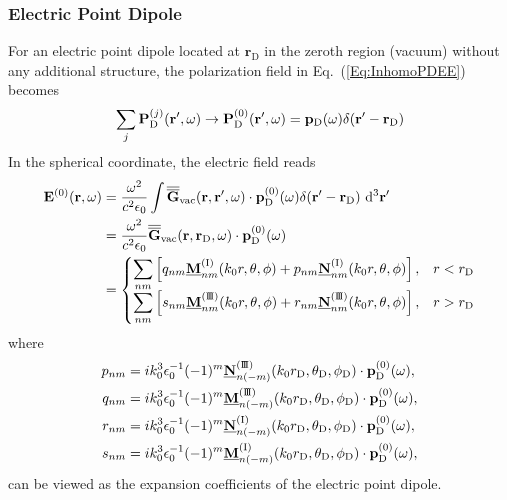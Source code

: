 \documentclass[journal=jacsat,manuscript=article,layout=traditional]{achemso}
\newcommand*\diff{\mathrm{d}}
\newcommand*\emp{\mathbf{P}}
\newcommand*\br{\mathbf{r}}
\newcommand{\norF}[1]{\underline{\vb{#1}}}
\newcommand{\joinR}{\hspace{-.17em}}
\newcommand{\RomanI}{\scriptsize\textrm{I}}
\newcommand{\RomanIII}{\mbox{\RomanI\joinR\RomanI\joinR\RomanI}}
\begin{document}
\subsubsection{Electric Point Dipole}
For an electric point dipole located at $\br_\mathrm{D}$ in the zeroth region (vacuum) without any additional structure, the polarization field in Eq.~(\ref{Eq:InhomoPDEE}) becomes
\begin{align}
    \sum_j\emp_\textrm{D}^{(j)}(\br',\omega) \rightarrow \emp_\textrm{D}^{(0)}(\br',\omega)=\vb{p}_\textrm{D}(\omega)\delta(\br'-\br_\mathrm{D})
\end{align}
In the spherical coordinate, the electric field reads
\begin{align}
    \nonumber
    \mathbf{E}^{(0)}(\mathbf{r},\omega) &= \frac{\omega^2}{c^2\epsilon_0}\int
    \overline{\overline{\mathbf{G}}}_\mathrm{vac}(\mathbf{r,r'},\omega)\cdot
    \mathbf{p}_\textrm{D}^{(0)}(\omega)
    \delta(\mathbf{r'}-\mathbf{r}_\textrm{D})~\diff^3\mathbf{r'}\\
    \nonumber
    &=\frac{\omega^2}{c^2\epsilon_0}
    \overline{\overline{\mathbf{G}}}_\mathrm{vac}(\mathbf{r},\mathbf{r}_\textrm{D},\omega)\cdot
    \mathbf{p}_\textrm{D}^{(0)}(\omega)\\
    &=
    \begin{cases}
        \displaystyle
        \sum_{nm}\left[q_{nm}\norF{M}_{\mathstrut{nm}}^{(\RomanI)}(k_0r,\theta,\phi)+p_{nm}\norF{N}_{\mathstrut{nm}}^{(\RomanI)}(k_0r,\theta,\phi)\right], & r < r_\mathrm{D}\\
        \displaystyle
        \sum_{nm}\left[s_{nm}\norF{M}_{\mathstrut{nm}}^{(\RomanIII)}(k_0r,\theta,\phi)+r_{nm}\norF{N}_{\mathstrut{nm}}^{(\RomanIII)}(k_0r,\theta,\phi)\right], & r > r_\mathrm{D}\\
    \end{cases}
    \label{Eq:EdipoleExpand}
\end{align}
where 
\begin{subequations}
    \begin{align}
        p_{nm}&= ik_0^3\epsilon_0^{-1}(-1)^m\norF{N}_{n(-m)}^{(\RomanIII)}(k_0r_\mathrm{D},\theta_\mathrm{D},\phi_\mathrm{D})\cdot\mathbf{p}_\textrm{D}^{(0)}(\omega),\\
        q_{nm}&= ik_0^3\epsilon_0^{-1}(-1)^m\norF{M}_{n(-m)}^{(\RomanIII)}(k_0r_\mathrm{D},\theta_\mathrm{D},\phi_\mathrm{D})\cdot\mathbf{p}_\textrm{D}^{(0)}(\omega),\\
        r_{nm}&= ik_0^3\epsilon_0^{-1}(-1)^m\norF{N}_{n(-m)}^{(\RomanI)}(k_0r_\mathrm{D},\theta_\mathrm{D},\phi_\mathrm{D})\cdot\mathbf{p}_\textrm{D}^{(0)}(\omega),\\
        s_{nm}&= ik_0^3\epsilon_0^{-1}(-1)^m\norF{M}_{n(-m)}^{(\RomanI)}(k_0r_\mathrm{D},\theta_\mathrm{D},\phi_\mathrm{D})\cdot\mathbf{p}_\textrm{D}^{(0)}(\omega),
    \end{align}
    \label{Eq:EdipoleExpandcoeff}
\end{subequations}
can be viewed as the expansion coefficients of the electric point dipole.
\newpage
\end{document}
